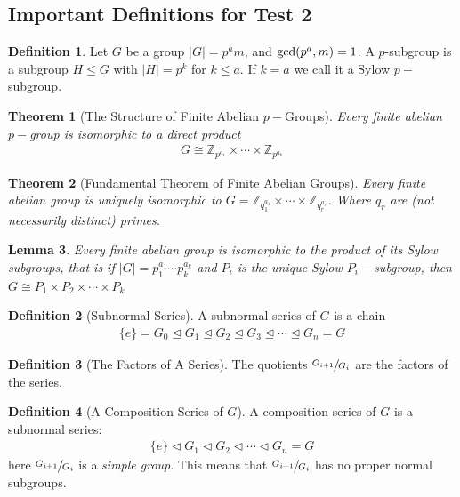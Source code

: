 \documentclass[titlepage]{article}
\theoremstyle{plain}
\newtheorem{theorem}{Theorem}[section]
\newtheorem{lemma}[theorem]{Lemma}
\theoremstyle{definition}
\newtheorem{definition}{Definition}[section]
\theoremstyle{remark}
\theoremstyle{exercise-style}
\numberwithin{equation}{section}
\numberwithin{theorem}{section}
\numberwithin{remark}{section}
\begin{document}
\subsection{Important Definitions for Test 2}

\begin{definition}
    Let $G$ be a group $|G| = p^am$, and $\textnormal{gcd}(p^a,m)=1$. A $p$-subgroup is a subgroup $H \leqslant G$ with $|H|=p^k$ for $k \leq a$. If $k = a$ we call it a Sylow $p-$subgroup.
\end{definition}

\begin{theorem}[The Structure of Finite Abelian $p-$Groups]
    Every finite abelian $p-$group is isomorphic to a direct product
    \begin{align}
        G \cong \mathbb{Z}_{p^{a_1}} \times \cdots \times \mathbb{Z}_{p^{a_k}}
    \end{align}
\end{theorem}

\begin{theorem}[Fundamental Theorem of Finite Abelian Groups]
    Every finite abelian group is uniquely isomorphic to $G = \mathbb{Z}_{q_1^{a_1}} \times \cdots \times \mathbb{Z}_{q_r^{a_r}}$. Where $q_r$ are (not necessarily distinct) primes. 
\end{theorem}

\begin{lemma}
    Every finite abelian group is isomorphic to the product of its Sylow subgroups, that is if $|G| =p_1^{a_1}\cdots p_k^{a_k}$ and $P_i$ is the unique Sylow $P_i-$subgroup, then $G \cong P_1 \times P_2 \times \cdots \times P_k$
\end{lemma}

\begin{definition}[Subnormal Series]
    A subnormal series of $G$ is a chain
    \begin{align}
        \{ e \} = G_0 \trianglelefteq G_1 \trianglelefteq G_2 \trianglelefteq G_3 \trianglelefteq \cdots \trianglelefteq G_n = G 
    \end{align}
\end{definition}

\begin{definition}[The Factors of A Series]
    The quotients $\sfrac{G_{i +1}}{G_i}$ are the factors of the series.
\end{definition}

\begin{definition}[A Composition Series of $G$]
    A composition series of $G$ is a subnormal series:
    \begin{align}
        \{ e \} \triangleleft G_1 \triangleleft G_2 \triangleleft \cdots \triangleleft G_n = G
    \end{align}
    here $\sfrac{G_{i+1}}{G_i}$ is a \textit{simple group}. This means that $\sfrac{G_{i+1}}{G_i}$ has no proper normal subgroups.
\end{definition}
\end{document}

